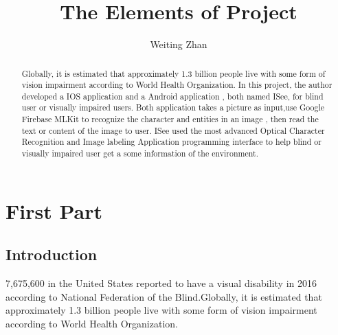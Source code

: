 \documentclass[11pt]{ucscthesis}
\begin{document}

\title{The Elements of Project}
\author{Weiting Zhan}
\deanlinethree{}

\begin{frontmatter}

\maketitle
\copyrightpage

\tableofcontents
\listoffigures
\listoftables

\begin{abstract}
Globally, it is estimated that approximately 1.3 billion people live with some form of vision impairment according to World Health Organization. In this project, the author developed a IOS application and a Android application , both named ISee, for blind user or visually impaired users. Both application takes a picture as input,use Google Firebase MLKit to recognize the character and entities in an image , then read the text or content of the image to user. ISee used the most advanced Optical Character Recognition and Image labeling Application programming interface to help blind or visually impaired user get a some information of the environment. 

\end{abstract}




\end{frontmatter}

\part{First Part}

\chapter{Introduction}
 7,675,600  in the United States reported to have a visual disability in 2016 according to National Federation of the Blind\cite{USBlindStatistics}.Globally, it is estimated that approximately 1.3 billion people live with some form of vision impairment according to World Health Organization.\cite{WHOlindStatistics}
\end{document}
